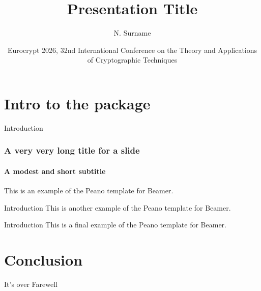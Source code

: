 \documentclass{beamer}
\title{Presentation Title}
\author[N.S.]{N. Surname}
\institute{Politecnico di Torino}
\date[EC26]{Eurocrypt 2026, 32nd International Conference on the Theory and Applications of Cryptographic Techniques}
\begin{document}
\begin{frame}
  \titlepage
\end{frame}

\section{Intro to the package}

\begin{frame}{Introduction}
  \frametitle{A very very long title for a slide}
  \framesubtitle{A modest and short subtitle}
  This is an example of the Peano template for Beamer.
\end{frame}
\begin{frame}{Introduction}
  This is another example of the Peano template for Beamer.
\end{frame}
\begin{frame}{Introduction}
  This is a final example of the Peano template for Beamer.
\end{frame}

\section{Conclusion}
\begin{frame}{It's over}
  Farewell
\end{frame}
\end{document}
